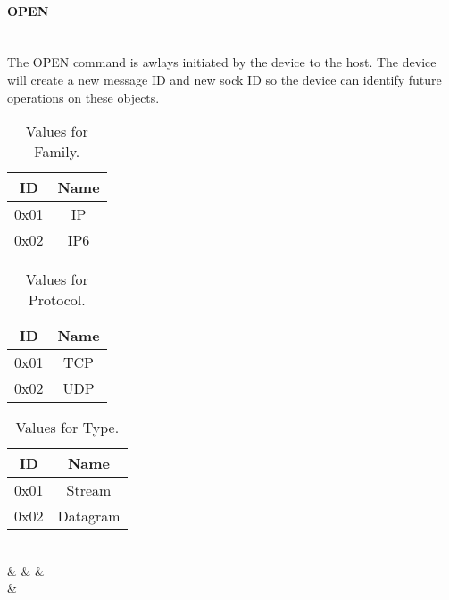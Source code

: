 \documentclass[10pt]{article}
\begin{document}
	\paragraph{OPEN} \mbox{}\\
	The OPEN command is awlays initiated by the device to the host. The device will create a new message ID and new sock ID so the device can identify future operations on these objects.\\
	\begin{table}[H]
		\begin{center}
			\caption{Values for Family.}
			\label{tab:table2}
			\begin{tabular}{c|c} 
				\rowcolor{lightgray}
				\textbf{ID} &	\textbf{Name}\\
				\hline
				0x01 & IP\\
				0x02 & IP6\\
			\end{tabular}
		\end{center}
	\end{table} 
	\begin{table}[H]
	\begin{center}
		\caption{Values for Protocol.}
		\label{tab:table3}
		\begin{tabular}{c|c} 
			\rowcolor{lightgray}
			\textbf{ID} &	\textbf{Name}\\
			\hline
			0x01 & TCP\\
			0x02 & UDP\\
		\end{tabular}
	\end{center}
	\end{table}
	\begin{table}[H]
	\begin{center}
		\caption{Values for Type.}
		\label{tab:table4}
		\begin{tabular}{c|c} 
			\rowcolor{lightgray}
			\textbf{ID} &	\textbf{Name}\\
			\hline
			0x01 & Stream\\
			0x02 & Datagram\\
		\end{tabular}
	\end{center}
	\end{table}
	\begin{bytefield}[bitwidth=1.7em]{32}
		 \\
			 &
			 &
			 &
			 \\
			 &
			 \\
			 \\
	\end{bytefield}\\
\end{document}
